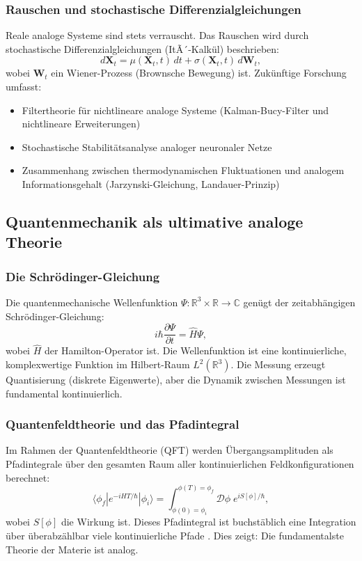 ﻿\documentclass[a4paper,12pt]{article}
\theoremstyle{definition}
\begin{document}
\subsubsection{Rauschen und stochastische Differenzialgleichungen}

Reale analoge Systeme sind stets verrauscht.  Das Rauschen wird durch
stochastische Differenzialgleichungen (ItÃ´-Kalkül) beschrieben:
\[
d\mathbf{X}_t = \mu(\mathbf{X}_t, t) \, dt + \sigma(\mathbf{X}_t, t) \, d\mathbf{W}_t,
\]
wobei $\mathbf{W}_t$ ein Wiener-Prozess (Brownsche Bewegung) ist.
Zukünftige Forschung umfasst:
\begin{itemize}
    \item Filtertheorie für nichtlineare analoge Systeme (Kalman-Bucy-Filter
          und nichtlineare Erweiterungen)
    \item Stochastische Stabilitätsanalyse analoger neuronaler Netze
    \item Zusammenhang zwischen thermodynamischen Fluktuationen und analogem
          Informationsgehalt (Jarzynski-Gleichung, Landauer-Prinzip)
\end{itemize}

\subsection{Quantenmechanik als ultimative analoge Theorie}

\subsubsection{Die Schrödinger-Gleichung}

Die quantenmechanische Wellenfunktion $\Psi: \mathbb{R}^3 \times \mathbb{R} \to \mathbb{C}$
genügt der zeitabhängigen Schrödinger-Gleichung:
\[
i\hbar \frac{\partial \Psi}{\partial t} = \hat{H} \Psi,
\]
wobei $\hat{H}$ der Hamilton-Operator ist.  Die Wellenfunktion ist eine
kontinuierliche, komplexwertige Funktion im Hilbert-Raum $L^2(\mathbb{R}^3)$.
Die Messung erzeugt Quantisierung (diskrete Eigenwerte), aber die Dynamik
zwischen Messungen ist fundamental kontinuierlich.

\subsubsection{Quantenfeldtheorie und das Pfadintegral}

Im Rahmen der Quantenfeldtheorie (QFT) werden Übergangsamplituden als
Pfadintegrale über den gesamten Raum aller kontinuierlichen Feldkonfigurationen
berechnet:
\[
\langle \phi_f | e^{-iHT/\hbar} | \phi_i \rangle
= \int_{\phi(0)=\phi_i}^{\phi(T)=\phi_f} \mathcal{D}\phi \; e^{iS[\phi]/\hbar},
\]
wobei $S[\phi]$ die Wirkung ist.  Dieses Pfadintegral ist buchstäblich eine
Integration über überabzählbar viele kontinuierliche Pfade \citep{Feynman1965}.
Dies zeigt: Die fundamentalste Theorie der Materie ist analog.
\end{document}
